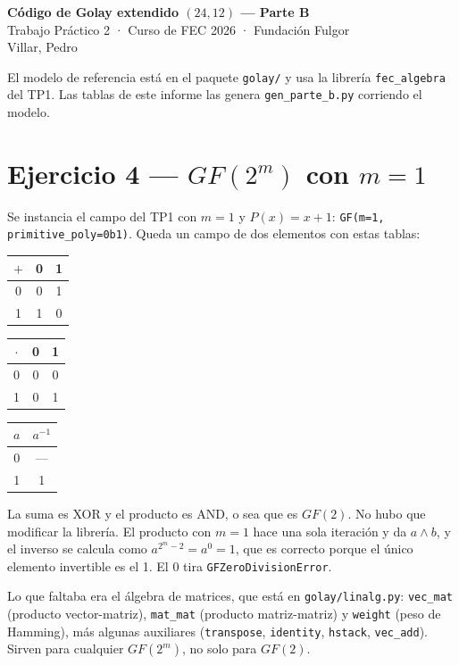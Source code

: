 \documentclass[11pt,a4paper]{article}
\begin{document}
\begin{center}
  {\large\bfseries Código de Golay extendido $(24,12)$ --- Parte B}\\[0.3ex]
  {\small Trabajo Práctico 2 · Curso de FEC 2026 · Fundación Fulgor}\\[0.3ex]
  {\small Villar, Pedro}
\end{center}

El modelo de referencia está en el paquete \texttt{golay/} y usa la
librería \texttt{fec\_algebra} del TP1. Las tablas de este informe las
genera \texttt{gen\_parte\_b.py} corriendo el modelo.

\section{Ejercicio 4 --- $GF(2^m)$ con $m=1$}

Se instancia el campo del TP1 con $m=1$ y $P(x)=x+1$:
\texttt{GF(m=1, primitive\_poly=0b1)}. Queda un campo de dos elementos
con estas tablas:

\begin{center}\small
\begin{tabular}[t]{@{}c|cc@{}}
$+$ & 0 & 1 \\
\midrule
0 & 0 & 1 \\
1 & 1 & 0 \\
\end{tabular}
\qquad
\begin{tabular}[t]{@{}c|cc@{}}
$\cdot$ & 0 & 1 \\
\midrule
0 & 0 & 0 \\
1 & 0 & 1 \\
\end{tabular}
\qquad
\begin{tabular}[t]{@{}c|c@{}}
$a$ & $a^{-1}$ \\
\midrule
0 & --- \\
1 & 1 \\
\end{tabular}
\end{center}

La suma es XOR y el producto es AND, o sea que es $GF(2)$. No hubo que
modificar la librería. El producto con $m=1$ hace una sola iteración y
da $a\wedge b$, y el inverso se calcula como $a^{2^m-2}=a^0=1$, que es
correcto porque el único elemento invertible es el 1. El 0 tira
\texttt{GFZeroDivisionError}.

Lo que faltaba era el álgebra de matrices, que está en
\texttt{golay/linalg.py}: \texttt{vec\_mat} (producto vector-matriz),
\texttt{mat\_mat} (producto matriz-matriz) y \texttt{weight} (peso de
Hamming), más algunas auxiliares (\texttt{transpose}, \texttt{identity},
\texttt{hstack}, \texttt{vec\_add}). Sirven para cualquier $GF(2^m)$, no
solo para $GF(2)$.
\end{document}
